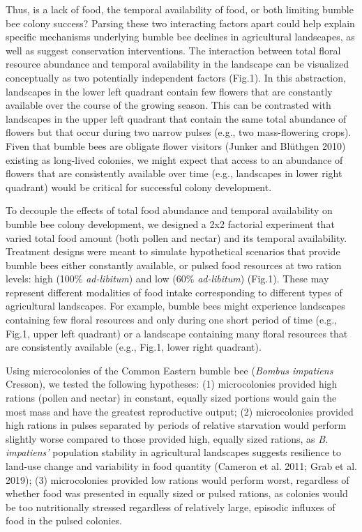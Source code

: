 \documentclass[11pt,]{article}
\begin{document}
Thus, is a lack of food, the temporal availability of food, or both
limiting bumble bee colony success? Parsing these two interacting
factors apart could help explain specific mechanisms underlying bumble
bee declines in agricultural landscapes, as well as suggest conservation
interventions. The interaction between total floral resource abundance
and temporal availability in the landscape can be visualized
conceptually as two potentially independent factors (Fig.1). In this
abstraction, landscapes in the lower left quadrant contain few flowers
that are constantly available over the course of the growing season.
This can be contrasted with landscapes in the upper left quadrant that
contain the same total abundance of flowers but that occur during two
narrow pulses (e.g., two mass-flowering crops). Fiven that bumble bees
are obligate flower visitors (Junker and Blüthgen 2010) existing as
long-lived colonies, we might expect that access to an abundance of
flowers that are consistently available over time (e.g., landscapes in
lower right quadrant) would be critical for successful colony
development.

To decouple the effects of total food abundance and temporal
availability on bumble bee colony development, we designed a 2x2
factorial experiment that varied total food amount (both pollen and
nectar) and its temporal availability. Treatment designs were meant to
simulate hypothetical scenarios that provide bumble bees either
constantly available, or pulsed food resources at two ration levels:
high (100\% \emph{ad-libitum}) and low (60\% \emph{ad-libitum}) (Fig.1).
These may represent different modalities of food intake corresponding to
different types of agricultural landscapes. For example, bumble bees
might experience landscapes containing few floral resources and only
during one short period of time (e.g., Fig.1, upper left quadrant) or a
landscape containing many floral resources that are consistently
available (e.g., Fig.1, lower right quadrant).

Using microcolonies of the Common Eastern bumble bee (\emph{Bombus
impatiens} Cresson), we tested the following hypotheses: (1)
microcolonies provided high rations (pollen and nectar) in constant,
equally sized portions would gain the most mass and have the greatest
reproductive output; (2) microcolonies provided high rations in pulses
separated by periods of relative starvation would perform slightly worse
compared to those provided high, equally sized rations, as \emph{B.
impatiens'} population stability in agricultural landscapes suggests
resilience to land-use change and variability in food quantity (Cameron
et al. 2011; Grab et al. 2019); (3) microcolonies provided low rations
would perform worst, regardless of whether food was presented in equally
sized or pulsed rations, as colonies would be too nutritionally stressed
regardless of relatively large, episodic influxes of food in the pulsed
colonies.
\end{document}
